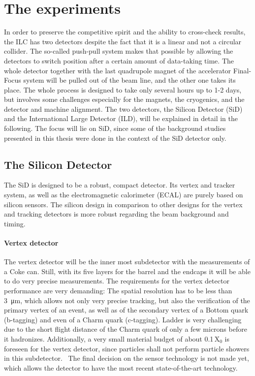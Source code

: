 \newpage
\section{The experiments}
\label{ILC:detectors}
In order to preserve the competitive spirit and the ability to cross-check results, the ILC has two detectors despite the fact that it is a linear and not a circular collider.
The so-called push-pull system makes that possible by allowing the detectors to switch position after a certain amount of data-taking time.
The whole detector together with the last quadrupole magnet of the accelerator Final-Focus system will be pulled out of the beam line, and the other one takes its place.
The whole process is designed to take only several hours up to 1-2 days, but involves some challenges especially for the magnets, the cryogenics, and the detector and machine alignment.\cite[p. 28-29]{TDR1}
The two detectors, the Silicon Detector (SiD) and the International Large Detector (ILD), will be explained in detail in the following.
The focus will lie on SiD, since some of the background studies presented in this thesis were done in the context of the SiD detector only.

\subsection{The Silicon Detector}
The SiD is designed to be a robust, compact detector.
Its vertex and tracker system, as well as the electromagnetic calorimeter (ECAL) are purely based on silicon sensors.
The silicon design in comparison to other designs for the vertex and tracking detectors is more robust regarding the beam background and timing.~\cite[cf. p. 57ff]{TDR4}
\paragraph{Vertex detector}
The vertex detector will be the inner most subdetector with the measurements of a Coke can.
Still, with its five layers for the barrel and the endcaps it will be able to do very precise measurements.
The requirements for the vertex detector performance are very demanding:
The spatial resolution has to be less than \SI{3}{\micro\meter}, which allows not only very precise tracking, but also the verification of the primary vertex of an event, as well as of the secondary vertex of a Bottom quark (b-tagging) and even of a Charm quark (c-tagging).
Ladder is very challenging due to the short flight distance of the Charm quark of only a few microns before it hadronizes.
Additionally, a very small material budget of about 0.1\,X$_0$ is foreseen for the vertex detector, since particles shall not perform particle showers in this subdetector.~\cite{SiD_Update}
The final decision on the sensor technology is not made yet, which allows the detector to have the most recent state-of-the-art technology.
